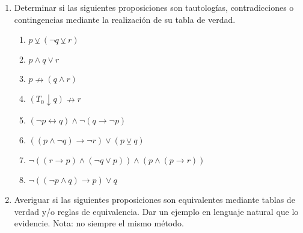 \documentclass[a4paper]{article}
\newcommand{\exercise}{\item}
\newcommand{\then}{\to}
\newcommand{\eq}{\leftrightarrow}
\newcommand{\xor}{\veebar}
\newcommand{\nor}{\downarrow}
\newcommand{\nimply}{\nrightarrow}
\begin{document}
\begin{enumerate}[resume]
\begin{multicols}{2}
\begin{enumerate} [label=(\alph*)]
		\item Ir rápido equivale a ir despacio pero sin pausas. 
		\item O termino las tareas en la semana, con lo que tendría el fin de semana libre, o las termino durante el fin de semana, con lo que tendría que abastecerme de café o mate.  
		\item Para aprobar, basta dedicar tiempo y atención a la materia.  
		\item Calavera no chilla y piola se la banca.
		\item Vine en tren y suspendieron el servicio, así que tengo que volver en colectivo o caminando.
		\item En un juego son importantes las mecánicas y la historia. Las mecánicas mantienen a la persona jugadora activa. La historia la mantiene interesada. 
		\item Decir que los fantasmas se ponen azules cuando el pacman come la fruta, es lo mismo que decir que los fantasmas están azules o el pacman no se comió la fruta. 
	\end{enumerate}
	\end{multicols}
	\exercise Determinar si las siguientes proposiciones son tautologías, contradicciones o contingencias mediante la realización de su tabla de verdad. 
	\begin{multicols}{2}
	\begin{enumerate} [label=(\alph*)]
		\item $p \xor  (\neg q \xor  r)$
		\item $p \land  q \lor  r$
		\item $p \nimply (q \land  r)$
		\item $(T_0 \nor q) \nimply r$
		\item $(\neg p \eq q) \land \neg (q \then \neg p)$
		\item $((p \land \neg q) \then \neg r) \lor (p \xor q)$
		\item $\neg ((r \then p) \land (\neg q \lor p)) \land ( p \land (p \then r))$
		\item $\neg ((\neg p \land q) \then p ) \lor q$
	\end{enumerate}
	\end{multicols}
	\exercise Averiguar si las siguientes proposiciones son equivalentes mediante tablas de verdad y/o reglas de equivalencia.  Dar un ejemplo en lenguaje natural que lo evidencie. Nota: no siempre el mismo método.
	\begin{multicols}{2}
	\begin{enumerate} [label=(\alph*)]

\end{enumerate}
\end{multicols}
\end{enumerate}
\end{document}
